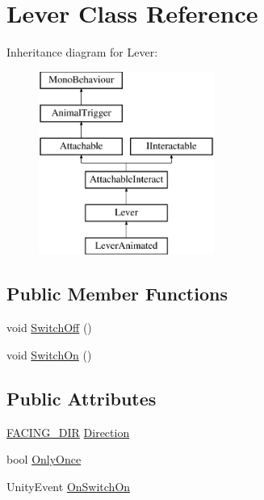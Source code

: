 \hypertarget{class_lever}{}\section{Lever Class Reference}
\label{class_lever}
Inheritance diagram for Lever\+:\begin{figure}[H]
\begin{center}
\leavevmode
\includegraphics[height=6.000000cm]{class_lever}
\end{center}
\end{figure}
\subsection*{Public Member Functions}
\begin{DoxyCompactItemize}
\item 
void \mbox{\hyperlink{class_lever_ad4664a40ec2e5b79f131462cdaffe2e6}{Switch\+Off}} ()
\item 
void \mbox{\hyperlink{class_lever_a6a6784337a703362735b8aefe6823fc9}{Switch\+On}} ()
\end{DoxyCompactItemize}
\subsection*{Public Attributes}
\begin{DoxyCompactItemize}
\item 
\mbox{\hyperlink{_animal_8cs_a57d10208ebba781ae206546ada2002b6}{F\+A\+C\+I\+N\+G\+\_\+\+D\+IR}} \mbox{\hyperlink{class_lever_a948c5bd1e0375b4678efc859d8a5c436}{Direction}}
\item 
bool \mbox{\hyperlink{class_lever_af2383e630c7e08865af9311f7fb8cb2e}{Only\+Once}}
\item 
Unity\+Event \mbox{\hyperlink{class_lever_af3917ece96d129c91aa972d1ed478a1c}{On\+Switch\+On}}
\end{DoxyCompactItemize}
